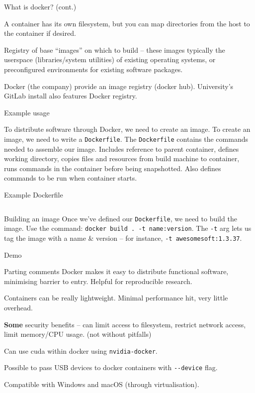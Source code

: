 \documentclass[10pt]{beamer}
\begin{document}
\begin{frame}[fragile]{What is docker? (cont.)}
	
	\vfill A container has its own filesystem, but you can map directories from the host to the container if desired.

	\vfill Registry of base ``images'' on which to build -- these images typically the userspace (libraries/system utilities) of existing operating systems, or preconfigured environments for existing software packages.

	\vfill Docker (the company) provide an image registry (docker hub). University's GitLab install also features Docker registry.
\end{frame}

\begin{frame}[fragile]{Example usage}

	\vfill To distribute software through Docker, we need to create an image.
	\vfill To create an image, we need to write a \verb|Dockerfile|.
	\vfill The \verb|Dockerfile| contains the commands needed to assemble our image.
	\vfill Includes reference to parent container, defines working directory, copies files and resources from build machine to container, runs commands in the container before being snapshotted.
	\vfill Also defines commands to be run when container starts.
\end{frame}

\begin{frame}[fragile]{Example Dockerfile}
	\inputminted{Dockerfile}{example/Dockerfile}
\end{frame}

\begin{frame}[fragile]{Building an image}
	\vfill Once we've defined our \verb|Dockerfile|, we need to build the image.
	\vfill Use the command: \verb|docker build . -t name:version|.
	\vfill The \verb|-t| arg lets us tag the image with a name \& version -- for instance, \verb|-t awesomesoft:1.3.37|.
\end{frame}

\begin{frame}[fragile]{Demo}

\vfill

\end{frame}

\begin{frame}[fragile]{Parting comments}
\vfill Docker makes it easy to distribute functional software, minimising barrier to entry. Helpful for reproducible research.

\vfill Containers can be really lightweight. Minimal performance hit, very little overhead. 

\vfill \textbf{Some} security benefits -- can limit access to filesystem, restrict network access, limit memory/CPU usage. (not without pitfalls) 

\vfill Can use cuda within docker using \verb|nvidia-docker|.

\vfill Possible to pass USB devices to docker containers with \verb|--device| flag.

\vfill Compatible with Windows and macOS (through virtualisation).

\end{frame}
\end{document}
